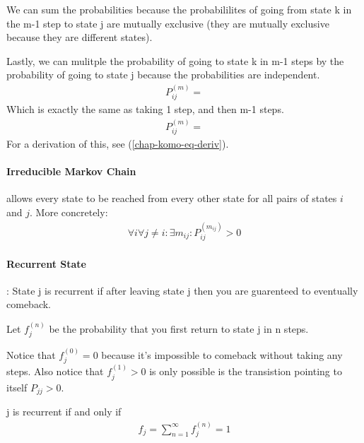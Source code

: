 We can sum the probabilities because the probabililites of going from state k in
the m-1 step to state j are mutually exclusive (they are mutually exclusive
because they are different states).

Lastly, we can mulitple the probability of going to state k in m-1 steps by the
probability of going to state j because the probabilities are independent.
\begin{equation*} \begin{split}
	P_{ij}^{(m)} = 
\end{split} \end{equation*}
Which is exactly the same as taking 1 step, and then m-1 steps.
\begin{equation*} \begin{split}
	P_{ij}^{(m)} = 
\end{split} \end{equation*}
For a derivation of this, see (\ref{chap-komo-eq-deriv}).


\paragraph{Irreducible Markov Chain} allows every state to be reached from every
other state for all pairs of states $i$ and $j$. More concretely:
\begin{equation*} \begin{split}
	\forall i \forall j \ne i : \exists m_{ij}  : P_{ij}^{(m_{ij})} > 0 
\end{split} \end{equation*}

\paragraph{Recurrent State}: State j is recurrent if after leaving state j then
you are guarenteed to eventually comeback.

Let $f_j^{(n)}$ be the probability that you first return to state j in n steps.

Notice that $f_j^{(0)} = 0$ because it's impossible to comeback without taking any
steps. Also notice that $f_j^{(1)} > 0$ is only possible is the transistion pointing
to itself $P_{jj} > 0$.

j is recurrent if and only if
\begin{equation*} \begin{split}
	f_j = \sum_{n=1}^\infty f_j^{(n)} = 1
\end{split} \end{equation*}


